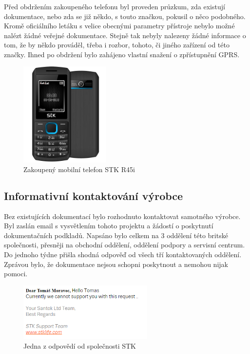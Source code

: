 \documentclass[FM,DP]{tulthesis}  %
\begin{document}
Před obdržením zakoupeného telefonu byl proveden průzkum, zda existují dokumentace, nebo zda se již někdo, s touto značkou, pokusil o něco podobného. Kromě oficiálního letáku s velice obecnými parametry přístroje nebylo možné nalézt žádné veřejné dokumentace. Stejně tak nebyly nalezeny žádné informace o tom, že by někdo prováděl, třeba i rozbor, tohoto, či jiného zařízení od této značky. Ihned po obdržení bylo zahájeno vlastní snažení o zpřístupnění GPRS.

\begin{figure}[H]
\begin{center}
\includegraphics[width=0.4\textwidth]{images/phone.png}
\caption{Zakoupený mobilní telefon STK R45i}
\label{image}
\end{center}
\end{figure}

\subsection{Informativní kontaktování výrobce}
Bez existujících dokumentací bylo rozhodnuto kontaktovat samotného výrobce.  Byl zaslán email s vysvětlením tohoto projektu a žádostí o poskytnutí dokumentačních podkladů. Napsáno bylo celkem na 3 oddělení této britské společnosti, přesněji na obchodní oddělení, oddělení podpory a servisní centrum. Do jednoho týdne přišla shodná odpověď od všech tří kontaktovaných oddělení. Zprávou bylo, že dokumentace nejsou schopni poskytnout a nemohou nijak pomoci.

\begin{figure}[H]
\begin{center}
\includegraphics[width=0.6\textwidth]{images/response.png}
\caption{Jedna z odpovědí od společnosti STK}
\label{image}
\end{center}
\end{figure}
\end{document}
